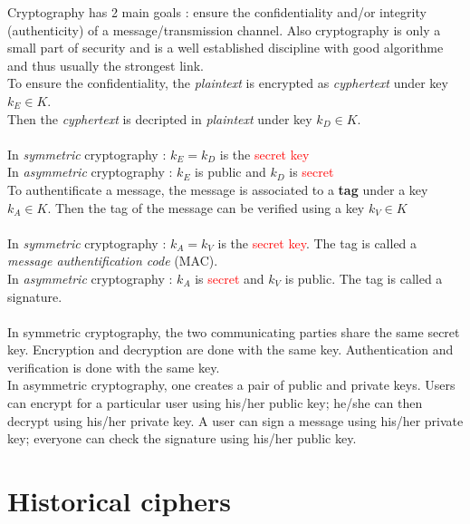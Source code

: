 \documentclass[11pt,a4paper]{report}
\begin{document}
Cryptography has 2 main goals : ensure the confidentiality and/or integrity (authenticity) of a message/transmission channel. Also cryptography is only a small part of security and is a well established discipline with good algorithme and thus usually the strongest link.\\

To ensure the confidentiality, the \textit{plaintext} is encrypted as \emph{cyphertext} under key $k_E \in K$.\\
Then the \emph{cyphertext} is decripted in \textit{plaintext} under key $k_D \in K$.\\
\\
In \emph{symmetric} cryptography : $k_E = k_D$ is the \textcolor{red}{secret key}\\
In \emph{asymmetric} cryptography : $k_E$ is \textcolor{ao}{public} and $k_D$ is \textcolor{red}{secret}\\

To authentificate a message, the message is associated to a \textbf{tag} under a key $k_A \in K$. Then the tag of the message can be verified using a key $k_V \in K$\\
\\
In \emph{symmetric} cryptography : $k_A = k_V$ is the \textcolor{red}{secret key}. The tag is called a \textit{message authentification code} (MAC).\\
In \emph{asymmetric} cryptography : $k_A$ is \textcolor{red}{secret} and $k_V$ is \textcolor{ao}{public}. The tag is called a signature.\\
\\
In symmetric cryptography, the two communicating parties share the same secret key. Encryption and decryption are done with the same key. Authentication and verification is done with the same key.
\\
In asymmetric cryptography, one creates a pair of public and private keys. Users can encrypt for a particular user using his/her public key; he/she can then decrypt using his/her private key. A user can sign a message using his/her private key; everyone can check the signature using his/her public key.

\section{Historical ciphers}
\end{document}
